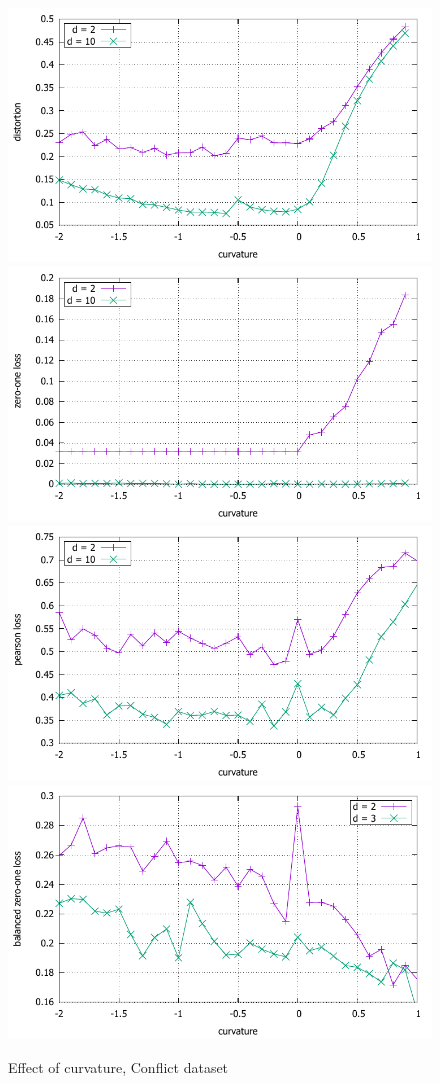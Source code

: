 \documentclass{article} %
\begin{document}
\begin{figure}
    \centering
    \includegraphics[width = 0.49 \textwidth]{conflict_distortion.pdf}
    \includegraphics[width = 0.49 \textwidth]{conflict_zero_one.pdf}
    \includegraphics[width = 0.49 \textwidth]{conflict_pearson.pdf}
    \includegraphics[width = 0.49 \textwidth]{conflict_balanced_zero_one.pdf}
    \caption{Effect of curvature, Conflict dataset}
    \label{fig:conflict}
\end{figure}
\end{document}

